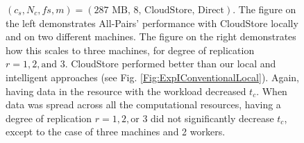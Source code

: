 \documentclass{rspublic}
\newcommand{\fixme}[1]{ { \bf{ ***FIXME: #1
}} } \newcommand{\jhanote}[1]{ {\textcolor{red} { ***Jha: #1 }}}
\newcommand{\micnote}[1]{ {\textcolor{blue} { ***Michael: #1 }}}
\newcommand{\betynote}[1]{ {\textcolor{orange} { ***Bety: #1 }}}
\newcommand{\jhanote}[1]{} \newcommand{\micnote}[1]{}\newcommand{\betynote}[1]{} \newcommand{\fixme}[1]{}
\begin{document}
\begin{figure}
\begin{center}
\caption{$(c_s, N_c, f\!s, m) = (\mbox{287 MB, 8, CloudStore,
Direct})$. The figure on the left demonstrates All-Pairs' performance
with CloudStore locally and on two different machines. The figure on the
right demonstrates how this scales to three machines, for degree of
replication $r=1,2,\mbox{and } 3$. CloudStore performed better than our
local and intelligent approaches (see Fig.
\ref{Fig:ExpIConventionalLocal}). Again,
having data in the resource with the workload decreased $t_c$. When data
was spread across all the computational resources, having a degree of
replication $r = 1, 2, \mbox{or } 3$ did not significantly decrease
$t_c$, except to the case of three machines and 2 workers.}
\label{Fig:experiment3}
\end{center}
\vspace{-0.3cm}
\end{figure}
\end{document}
